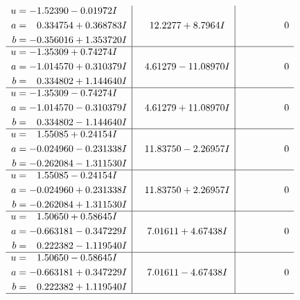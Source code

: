 \documentclass[1p]{elsarticle_modified}
\theoremstyle{definition}
\begin{document}
$$\begin{array}{c|c|c}
\begin{aligned}
u &= -1.52390 - 0.01972 I \\
a &= \phantom{-}0.334754 + 0.368783 I \\
b &= -0.356016 + 1.353720 I\end{aligned}
 & \phantom{-}12.2277 + 8.7964 I & \phantom{-0.000000 } 0 \\ \hline\begin{aligned}
u &= -1.35309 + 0.74274 I \\
a &= -1.014570 + 0.310379 I \\
b &= \phantom{-}0.334802 + 1.144640 I\end{aligned}
 & \phantom{-}4.61279 - 11.08970 I & \phantom{-0.000000 } 0 \\ \hline\begin{aligned}
u &= -1.35309 - 0.74274 I \\
a &= -1.014570 - 0.310379 I \\
b &= \phantom{-}0.334802 - 1.144640 I\end{aligned}
 & \phantom{-}4.61279 + 11.08970 I & \phantom{-0.000000 } 0 \\ \hline\begin{aligned}
u &= \phantom{-}1.55085 + 0.24154 I \\
a &= -0.024960 - 0.231338 I \\
b &= -0.262084 - 1.311530 I\end{aligned}
 & \phantom{-}11.83750 - 2.26957 I & \phantom{-0.000000 } 0 \\ \hline\begin{aligned}
u &= \phantom{-}1.55085 - 0.24154 I \\
a &= -0.024960 + 0.231338 I \\
b &= -0.262084 + 1.311530 I\end{aligned}
 & \phantom{-}11.83750 + 2.26957 I & \phantom{-0.000000 } 0 \\ \hline\begin{aligned}
u &= \phantom{-}1.50650 + 0.58645 I \\
a &= -0.663181 - 0.347229 I \\
b &= \phantom{-}0.222382 - 1.119540 I\end{aligned}
 & \phantom{-}7.01611 + 4.67438 I & \phantom{-0.000000 } 0 \\ \hline\begin{aligned}
u &= \phantom{-}1.50650 - 0.58645 I \\
a &= -0.663181 + 0.347229 I \\
b &= \phantom{-}0.222382 + 1.119540 I\end{aligned}
 & \phantom{-}7.01611 - 4.67438 I & \phantom{-0.000000 } 0\\
 \hline 
 \end{array}$$\newpage\newpage\renewcommand{\arraystretch}{1}
\end{document}
